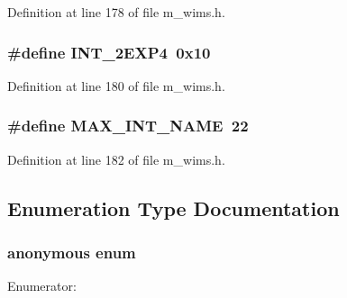 Definition at line 178 of file m\_\-wims.h.
\subsubsection{\setlength{\rightskip}{0pt plus 5cm}\#define INT\_\-2EXP4~0x10}\label{m__wims_8h_0529ef9c1bae004b6dd773989e2715ca}




Definition at line 180 of file m\_\-wims.h.
\subsubsection{\setlength{\rightskip}{0pt plus 5cm}\#define MAX\_\-INT\_\-NAME~22}\label{m__wims_8h_63c8b4f0123f5e922a8bbf69b239692e}




Definition at line 182 of file m\_\-wims.h.

\subsection{Enumeration Type Documentation}
\subsubsection{\setlength{\rightskip}{0pt plus 5cm}anonymous enum}\label{m__wims_8h_db49720dc49f7d4e4cf9adbf2948e409}


\begin{Desc}
\item[Enumerator: ]\par
\begin{description}
\item[{\em 
M\_\-WIMS\_\-16\label{m__wims_8h_db49720dc49f7d4e4cf9adbf2948e409e44a894c02c37f0ef06f279d414ff871}
}]\item[{\em 
M\_\-WIMS\_\-24\label{m__wims_8h_db49720dc49f7d4e4cf9adbf2948e409ba113c092f07d8aa4bca0bde748c197f}
}]\end{description}
\end{Desc}



